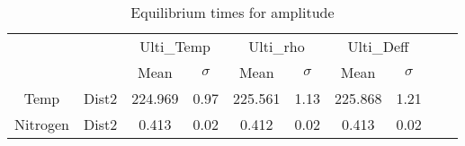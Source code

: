 \begin{table}[h]
\centering
\caption{Equilibrium times for amplitude}
\label{table:5}
\begin{tabular}{cccccccccc}
\toprule
 &  & \multicolumn{2}{c}{Ulti_Temp} & \multicolumn{2}{c}{Ulti_rho} & \multicolumn{2}{c}{Ulti_Deff} \\
 &  & Mean & $\sigma$ & Mean & $\sigma$ & Mean & $\sigma$ \\
\midrule
Temp & Dist2 & 224.969 & 0.97 & 225.561 & 1.13 & 225.868 & 1.21 \\
Nitrogen & Dist2 & 0.413 & 0.02 & 0.412 & 0.02 & 0.413 & 0.02 \\
\bottomrule
\end{tabular}
\end{table}
